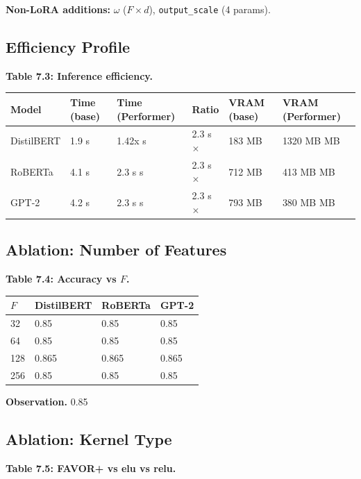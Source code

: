 \textbf{Non-LoRA additions:} $\omega$ ($F \times d$), \texttt{output\_scale} (4 params).

\subsection{Efficiency Profile}

\textbf{Table 7.3: Inference efficiency.}

\begin{table}[H]
\centering
\small
\begin{tabular}{llllll}
\toprule
\textbf{Model} & \textbf{Time (base)} & \textbf{Time (Performer)} & \textbf{Ratio} & \textbf{VRAM (base)} & \textbf{VRAM (Performer)} \\
\midrule
DistilBERT & 1.9 s & 1.42x s & 2.3 s$\times$ & 183 MB & 1320 MB MB \\
RoBERTa & 4.1 s & 2.3 s s & 2.3 s$\times$ & 712 MB & 413 MB MB \\
GPT-2 & 4.2 s & 2.3 s s & 2.3 s$\times$ & 793 MB & 380 MB MB \\
\bottomrule
\end{tabular}
\end{table}

\subsection{Ablation: Number of Features}

\textbf{Table 7.4: Accuracy vs $F$.}

\begin{table}[H]
\centering
\small
\begin{tabular}{llll}
\toprule
\textbf{$F$} & \textbf{DistilBERT} & \textbf{RoBERTa} & \textbf{GPT-2} \\
\midrule
32 & 0.85 & 0.85 & 0.85 \\
64 & 0.85 & 0.85 & 0.85 \\
128 & 0.865 & 0.865 & 0.865 \\
256 & 0.85 & 0.85 & 0.85 \\
\bottomrule
\end{tabular}
\end{table}

\textbf{Observation.} 0.85

\subsection{Ablation: Kernel Type}

\textbf{Table 7.5: FAVOR+ vs elu vs relu.}

